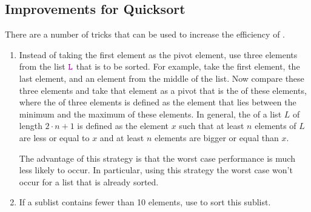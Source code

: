 \subsection{Improvements for Quicksort}
There are a number of tricks that can be used to increase the efficiency of .
\begin{enumerate}
\item Instead of taking the first element as the pivot element, use three elements from the list
      $\mytt{L}$ that is to be sorted.  For example, take the first element, the last element, and an
      element from the middle of the list.  Now compare these three elements and take that element as
      a pivot that is the  of these elements,  where the   of three
      elements is defined as the element that lies between the minimum and the maximum of these elements.
      In general, the  of a list $L$ of length $2 \cdot n +1$ is defined as the element $x$ such that at
      least $n$ elements of $L$ are less or equal to $x$ and at least $n$ elements are bigger or equal than $x$.
      
      The advantage of this strategy is that the worst case performance is much less likely to occur.  In
      particular,  using this strategy the worst case won't occur for a list that is already
      sorted.
\item If a sublist contains fewer than 10 elements, use  to sort this sublist.


\end{enumerate}
